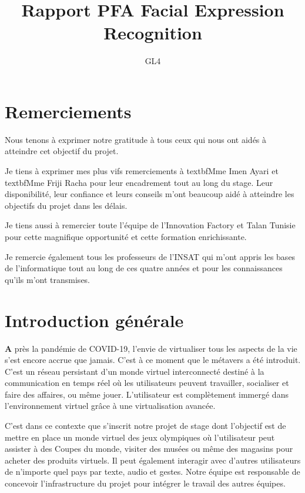 \documentclass[12pt,a4paper,oneside,french]{book}
\author{GL4}
\title{Rapport PFA Facial Expression Recognition}
\newcommand\blankpage{%
    \null
    \thispagestyle{empty}%
    \addtocounter{page}{-1}%
    \newpage}
\begin{document}

\dominitoc
{}
\frontmatter
{}
\afterpage{\blankpage}
\chapter*{\textbf{Remerciements}}
\normalsize{
\quad Nous tenons à exprimer notre gratitude à tous ceux qui nous ont aidés à atteindre cet objectif du projet.

\indent Je tiens à exprimer mes plus vifs remerciements à textbf{Mme Imen Ayari} et textbf{Mme Friji Racha}
pour leur encadrement tout au long du stage. Leur disponibilité, leur confiance et leurs conseils m’ont beaucoup aidé à atteindre les objectifs du projet dans les délais.

\indent Je tiens aussi à remercier toute l'équipe de l'Innovation Factory et Talan Tunisie pour cette magnifique opportunité et cette formation enrichissante.

\indent Je remercie également tous les professeurs de l'INSAT qui m'ont appris les bases de l'informatique tout au long de ces quatre années et pour les connaissances qu'ils m'ont transmises.
}



\tableofcontents
\newpage 
\listoffigures \mtcaddchapter 
\newpage 
{}

\mainmatter
\chapter*{\textbf{Introduction générale}}

\lettrine[findent=2pt]{\textbf{A}}{ }près la pandémie de COVID-19, l'envie de virtualiser tous les aspects de la vie s'est encore accrue que jamais. C'est à ce moment que le métavers a été introduit. C'est un réseau persistant d'un monde virtuel interconnecté destiné à la communication en temps réel où les utilisateurs peuvent travailler, socialiser et faire des affaires, ou même jouer. L'utilisateur est complètement immergé dans l'environnement virtuel grâce à une virtualisation avancée.

C'est dans ce contexte que s'inscrit notre projet de stage dont l'objectif est de mettre en place un monde virtuel des jeux olympiques où l'utilisateur peut assister à des Coupes du monde, visiter des musées ou même des magasins pour acheter des produits virtuels. Il peut également interagir avec d'autres utilisateurs de n'importe quel pays par texte, audio et gestes. Notre équipe est responsable de concevoir l'infrastructure du projet pour intégrer le travail des autres équipes.
\end{document}
